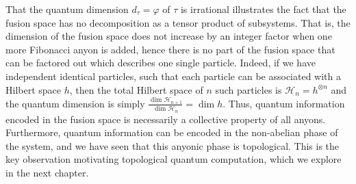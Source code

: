 That the quantum dimension $d_τ = φ$ of $τ$ is irrational illustrates the fact that the fusion space has no decomposition as a tensor product of subsystems. That is, the dimension of the fusion space does not increase by an integer factor when one more Fibonacci anyon is added, hence there is no part of the fusion space that can be factored out which describes one single particle. Indeed, if we have independent identical particles, such that each particle can be associated with a Hilbert space $h$, then the total Hilbert space of $n$ such particles is $\mathcal{H}_n = h^{⊗n}$ and the quantum dimension is simply $\frac{\dim \mathcal{H}_{n+1}}{\dim \mathcal{H}_n} = \dim h$. Thus, quantum information encoded in the fusion space is necessarily a collective property of all anyons. Furthermore, quantum information can be encoded in the non-abelian phase of the system, and we have seen that this anyonic phase is topological. This is the key observation motivating topological quantum computation, which we explore in the next chapter.




